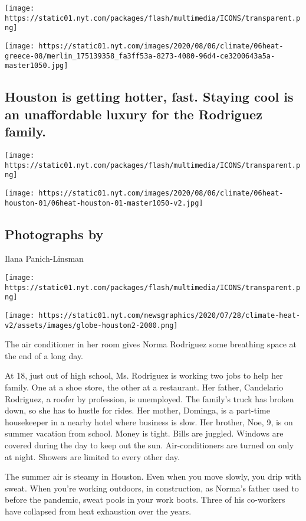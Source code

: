 \texttt{[image: https://static01.nyt.com/packages/flash/multimedia/ICONS/transparent.png]}

\texttt{[image: https://static01.nyt.com/images/2020/08/06/climate/06heat-greece-08/merlin\_175139358\_fa3ff53a-8273-4080-96d4-ce3200643a5a-master1050.jpg]}

\hypertarget{houston-is-getting-hotter-fast-staying-cool-is-an-unaffordable-luxury-for-the-rodriguez-family}{%
\subsection{Houston is getting hotter, fast. Staying cool is an
unaffordable luxury for the Rodriguez
family.}\label{houston-is-getting-hotter-fast-staying-cool-is-an-unaffordable-luxury-for-the-rodriguez-family}}

\texttt{[image: https://static01.nyt.com/packages/flash/multimedia/ICONS/transparent.png]}

\texttt{[image: https://static01.nyt.com/images/2020/08/06/climate/06heat-houston-01/06heat-houston-01-master1050-v2.jpg]}

\hypertarget{photographs-by-1}{%
\subsection{Photographs by}\label{photographs-by-1}}

Ilana Panich-Linsman

\texttt{[image: https://static01.nyt.com/packages/flash/multimedia/ICONS/transparent.png]}

\texttt{[image: https://static01.nyt.com/newsgraphics/2020/07/28/climate-heat-v2/assets/images/globe-houston2-2000.png]}

The air conditioner in her room gives Norma Rodriguez some breathing
space at the end of a long day.

At 18, just out of high school, Ms. Rodriguez is working two jobs to
help her family. One at a shoe store, the other at a restaurant. Her
father, Candelario Rodriguez, a roofer by profession, is unemployed. The
family's truck has broken down, so she has to hustle for rides. Her
mother, Dominga, is a part-time housekeeper in a nearby hotel where
business is slow. Her brother, Noe, 9, is on summer vacation from
school. Money is tight. Bills are juggled. Windows are covered during
the day to keep out the sun. Air-conditioners are turned on only at
night. Showers are limited to every other day.

The summer air is steamy in Houston. Even when you move slowly, you drip
with sweat. When you're working outdoors, in construction, as Norma's
father used to before the pandemic, sweat pools in your work boots.
Three of his co-workers have collapsed from heat exhaustion over the
years.

